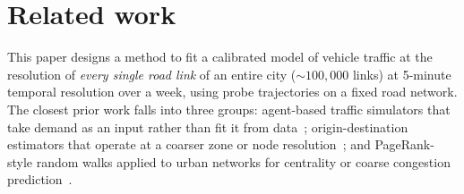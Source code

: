 \documentclass[sigconf, review]{acmart}
\begin{document}





\section{Related work}
\label{sec:related-work}

This paper designs a method to fit a
calibrated model of vehicle traffic at the resolution of
\emph{every single road link} of an entire city
($\sim 100{,}000$ links) at 5-minute temporal resolution over a week, using probe trajectories on a fixed
road network.  
The closest prior work
falls into three groups: agent-based traffic simulators that
take demand as an input rather than fit it from
data~\cite{horni2016matsim, balmer2006matsim};
origin-destination estimators that operate at a coarser zone
or node resolution~\cite{iqbal2014odmatrices, yang2017odprobe};
and PageRank-style random walks applied to urban networks for
centrality or coarse congestion
prediction~\cite{agryzkov2023nonlocal, wang2017pagerank, jiang2009ranking}.
\end{document}
